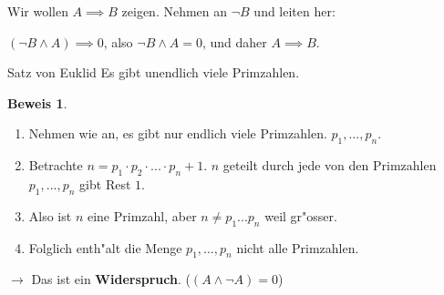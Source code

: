 \documentclass[oneside,fontsize=11pt,paper=a4,BCOR=0mm,DIV=12,automark,headsepline]{scrbook}
\theoremstyle{remark}
\theoremstyle{definition}
\theoremstyle{definition}
\newtheorem*{prof}{Beweis}
\theoremstyle{remark}
\begin{document}
Wir wollen \(A\implies B\) zeigen.
Nehmen an \(\neg B\) und leiten her:\\
\begin{relation}
  \((\neg B \wedge A)\implies 0\), also \(\neg B\wedge A = 0\), und daher \(A\implies
  B\).
\end{relation}

\begin{theo}{Satz von Euklid}{}
  Es gibt unendlich viele Primzahlen.
\end{theo}

\begin{prof}\
  \begin{enumerate}
  \item Nehmen wie an, es gibt nur endlich viele Primzahlen. \(p_1, ..., p_n\).
  \item Betrachte \(n=p_1\cdot p_2\cdot ... \cdot p_n + 1\). \(n\) geteilt durch jede
    von den Primzahlen \(p_1, ..., p_n\) gibt Rest \(1\).
  \item Also ist \(n\) eine Primzahl, aber \(n\not=p_1 ... p_n\) weil gr"osser.
  \item Folglich enth"alt die Menge \({p_1,...,p_n}\) nicht alle Primzahlen.
  \end{enumerate}
  \indent\indent \(\rightarrow\) Das ist ein \textbf{Widerspruch}. (\((A\wedge \neg A) = 0\))
\end{prof}
\end{document}
